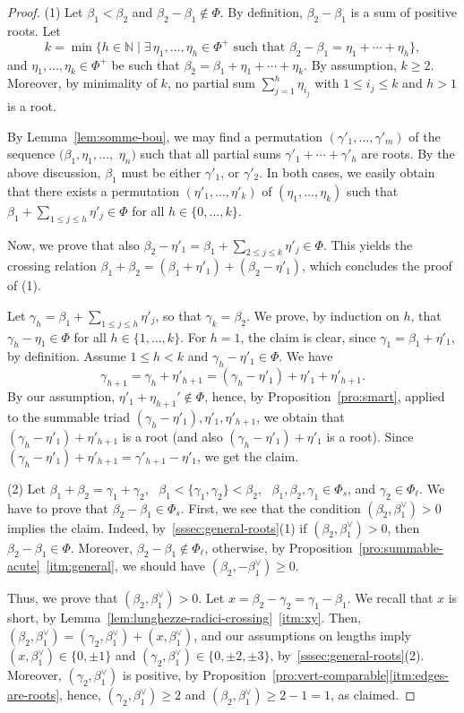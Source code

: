 \documentclass[10pt]{amsart}
\theoremstyle{definition}
\theoremstyle{remark}
\newcommand\nat{\mathbb N}
\newcommand\be{\beta}
\newcommand\ga{\gamma}
\renewcommand{\leq}{\leqslant}
\begin{document}
\begin{proof}
(1) Let $\be_1< \be_2$ and $\be_2-\be_1\not\in\Phi$. By definition, $\be_2-\be_1$ is a sum of positive roots. Let 
$$
k=\min\{h\in \nat \mid \exists\, \eta_1,\dots, \eta_h\in \Phi^+ \text{ such that }  \be_2-\be_1=\eta_1+\cdots+\eta_h\},
$$ 
and $\eta_1,\dots, \eta_k\in \Phi^+$ be such that $\be_2=\be_1+\eta_1+\cdots+\eta_k$. 
By assumption, $k\geq 2$. 
Moreover, by minimality of $k$, no partial sum $\sum_{j=1}^h\eta_{i_j}$ with $1\leq i_j\leq k$ and $h> 1$  is a root.
\par
By Lemma~\ref{lem:somme-bou},  we may find a permutation $(\ga'_1, \dots, \ga'_m)$ of the sequence $(\be_1, \eta_1, \dots,$ $\eta_n)$ such that all partial sums $\ga'_1+\cdots+\ga'_h$ are roots.
By the above discussion,  $\be_1$ must be either $\ga'_1$, or $\ga'_2$.
In both cases, we easily obtain that there exists a permutation $(\eta'_1, \dots, \eta'_k)$ of $(\eta_1, \dots, \eta_k)$ such that $\be_1+\sum\limits_{1\leq j\leq h}\eta'_j\in \Phi$ for all $h\in \{0, \dots, k\}$.
\par
Now, we prove that also $\be_2-\eta'_1=\be_1+\sum\limits_{2\leq j\leq k}\eta'_j\in \Phi$. 
This yields the crossing relation  $\be_1+\be_2=(\be_1+\eta'_1)+(\be_2-\eta'_1)$, which concludes the proof of (1). 
\par
Let $\ga_h=\be_1+\sum\limits_{1\leq j\leq h}\eta'_j$,
so that $\ga_k=\be_2$. 
We prove, by induction on $h$, that $\ga_h-\eta_1\in \Phi$ for all $h\in \{1, \dots, k\}$. 
For $h=1$, the claim is clear, since $\ga_1=\be_1+\eta'_1$, by definition.
Assume $1\leq h<k$ and   $\ga_h-\eta'_1\in \Phi$. 
We have 
$$
\ga_{h+1}=\ga_h+\eta'_{h+1}=(\ga_h-\eta'_1)+\eta'_1+\eta'_{h+1}.
$$
By our assumption, $\eta'_1+\eta_{h+1}'\not\in \Phi$, hence, by  Proposition~\ref{pro:smart}, applied to the summable triad $(\ga_h-\eta'_1), \eta'_1, \eta'_{h+1}$, we obtain that $(\ga_h-\eta'_1)+\eta'_{h+1}$ is a root (and also $(\ga_h-\eta'_1)+ \eta'_1$ is a root).
Since $(\ga_h-\eta'_1)+\eta'_{h+1}=\ga'_{h+1}-\eta'_1$, we get the claim.

(2)  Let $\be_1+\be_2=\ga_1+\ga_2$, \ $\be_1< \{\ga_1, \ga_2\}< \be_2$, \ $\be_1, \be_2, \ga_1\in \Phi_s$,  and  $\ga_2\in \Phi_\ell$. 
We have to prove that $\be_2-\be_1\in \Phi_s$.  
First, we see that the condition $(\be_2, \be_1^\vee)>0$ implies the claim.
Indeed, by~\ref{sssec:general-roots}(1) if $(\be_2, \be_1^\vee)>0$, then $\be_2-\be_1\in \Phi$.  
Moreover, $\be_2-\be_1\not\in \Phi_\ell$, otherwise, by Proposition~\ref{pro:summable-acute}~\ref{itm:general}, we should have $(\be_2, -\be_1^\vee)\geq 0$.
\par
Thus, we prove that $(\be_2, \be_1^\vee)>0$.
Let $x=\be_2-\ga_2=\ga_1-\be_1$. 
We recall that $x$ is short, by Lemma~\ref{lem:lunghezze-radici-crossing}~\ref{itm:xy}. 
Then, $(\be_2, \be_1^\vee)=(\ga_2, \be_1^\vee)+(x, \be_1^\vee)$, and our assumptions on lengths imply $(x, \be_1^\vee)\in \{0, \pm 1\}$ and $(\ga_2, \be_1^\vee)\in \{0, \pm2, \pm 3\}$, by~\ref{sssec:general-roots}(2).
Moreover, $(\ga_2, \be_1^\vee)$ is positive, by Proposition~\ref{pro:vert-comparable}\ref{itm:edges-are-roots}, hence,  $(\ga_2, \be_1^\vee)\geq 2$ and $(\be_2, \be_1^\vee)\geq 2-1=1$, as claimed.


\end{proof}
\end{document}
